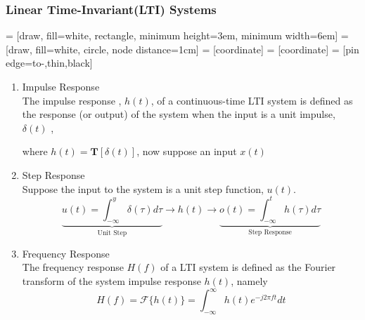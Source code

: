 \documentclass{article}
\begin{document}
\subsubsection{Linear Time-Invariant(LTI) Systems}
     = [draw, fill=white, rectangle, 
        minimum height=3em, minimum width=6em]
     = [draw, fill=white, circle, node distance=1cm]
     = [coordinate]
     = [coordinate]
     = [pin edge={to-,thin,black}]
\begin{enumerate}
    \item Impulse Response\\
    The impulse response , $h(t)$, of a continuous-time LTI system is defined as the response (or output) of the system when the input is a unit impulse, $\delta(t)$ ,
    \begin{center}
    \end{center}
    where $h(t)=\textbf{T}[\delta(t)]$, now suppose an input $x(t)$ 
    \begin{center}
    \end{center}
    \item Step Response \\
    Suppose the input to the system is a unit step function, $u(t)$.
    \[\underbrace{u(t)=\int^y_{-\infty}\delta(\tau)d\tau}_\text{Unit Step}\rightarrow\boxed{h(t)}\rightarrow \underbrace{o(t)=\int^t_{-\infty}h(\tau)d\tau}_\text{Step Response}\]
    \item Frequency Response\\
    The frequency response $H(f)$ of a LTI system is defined as the Fourier transform of the system impulse response $h(t)$, namely
    \[H(f) = \mathscr{F}\{h(t)\}=\int^{\infty}_{-\infty}h(t)e^{-j2\pi ft}dt\]

\end{enumerate}
\end{document}
